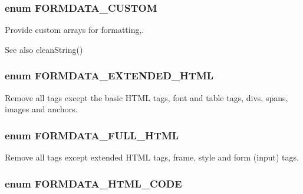 \subsubsection[{FORMDATA\_\-CUSTOM}]{\setlength{\rightskip}{0pt plus 5cm}enum {\bf FORMDATA\_\-CUSTOM}}\label{class_8formhandler_8php_ae5bb66ec27c03f3b03796f3bd80ba2ff}


Provide custom arrays for formatting,. 

\begin{DoxySeeAlso}{See also}
cleanString() 
\end{DoxySeeAlso}
\subsubsection[{FORMDATA\_\-EXTENDED\_\-HTML}]{\setlength{\rightskip}{0pt plus 5cm}enum {\bf FORMDATA\_\-EXTENDED\_\-HTML}}\label{class_8formhandler_8php_ac2f81495783870a3c4a63ab0164aa412}


Remove all tags except the basic HTML tags, font and table tags, divs, spans, images and anchors. 

\subsubsection[{FORMDATA\_\-FULL\_\-HTML}]{\setlength{\rightskip}{0pt plus 5cm}enum {\bf FORMDATA\_\-FULL\_\-HTML}}\label{class_8formhandler_8php_ac1497f65ec29dadf9d39c5da41e17fc3}


Remove all tags except extended HTML tags, frame, style and form (input) tags. 

\subsubsection[{FORMDATA\_\-HTML\_\-CODE}]{\setlength{\rightskip}{0pt plus 5cm}enum {\bf FORMDATA\_\-HTML\_\-CODE}}\label{class_8formhandler_8php_a73c85f0f80e1060e1adf1efb73639845}


